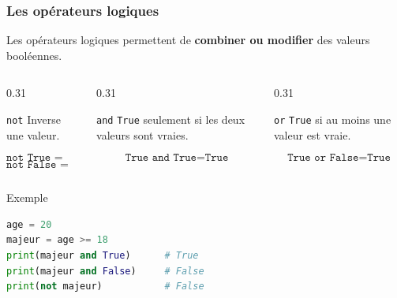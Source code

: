 \documentclass[10pt]{beamer}
\begin{document}
\begin{frame}[containsverbatim]
\frametitle{Les opérateurs logiques}

Les opérateurs logiques permettent de \textbf{combiner ou modifier}
des valeurs booléennes.

\vspace{0.2cm}

\begin{columns}[T]
\begin{column}{0.31\textwidth}
\begin{block}{\texttt{not}}
Inverse une valeur.

\[
\texttt{not True = False}
\]
\[
\texttt{not False = True}
\]
\end{block}
\end{column}

\begin{column}{0.31\textwidth}
\begin{block}{\texttt{and}}
\texttt{True} seulement si
les deux valeurs sont vraies.

\[
\texttt{True and True}
=\texttt{True}
\]


\end{block}
\end{column}

\begin{column}{0.31\textwidth}
\begin{block}{\texttt{or}}
\texttt{True} si au moins
une valeur est vraie.

\[
\texttt{True or False}
=\texttt{True}
\]
\end{block}
\end{column}
\end{columns}

\vspace{0.25cm}

\begin{exampleblock}{Exemple}
\begin{lstlisting}[language=Python]
age = 20
majeur = age >= 18
print(majeur and True)      # True
print(majeur and False)     # False
print(not majeur)           # False
\end{lstlisting}
\end{exampleblock}

\end{frame}
\end{document}
